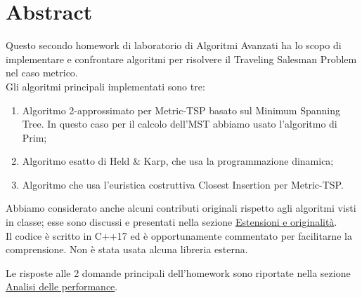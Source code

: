 \section{Abstract}
\label{cap:abstract}

Questo secondo homework di laboratorio di Algoritmi Avanzati ha lo scopo di implementare e confrontare algoritmi per risolvere il Traveling Salesman Problem nel caso metrico. \\

\noindent Gli algoritmi principali implementati sono tre:

\begin{enumerate}
    \item Algoritmo 2-approssimato per Metric-TSP basato sul Minimum Spanning Tree. In questo caso per il calcolo dell'MST abbiamo usato l'algoritmo di Prim;
    \item Algoritmo esatto di Held \& Karp, che usa la programmazione dinamica;
    \item Algoritmo che usa l'euristica costruttiva Closest Insertion per Metric-TSP.
\end{enumerate}

\noindent Abbiamo considerato anche alcuni contributi originali rispetto agli algoritmi visti in classe; esse sono discussi e presentati nella sezione \hyperref[cap:extensions-and-originalities]{Estensioni e originalità}. \\

\noindent Il codice è scritto in C++17 ed è opportunamente commentato per facilitarne la comprensione. Non è stata usata alcuna libreria esterna.

\noindent Le risposte alle 2 domande principali dell'homework sono riportate nella sezione \hyperref[cap:performance-analysis]{Analisi delle performance}.
